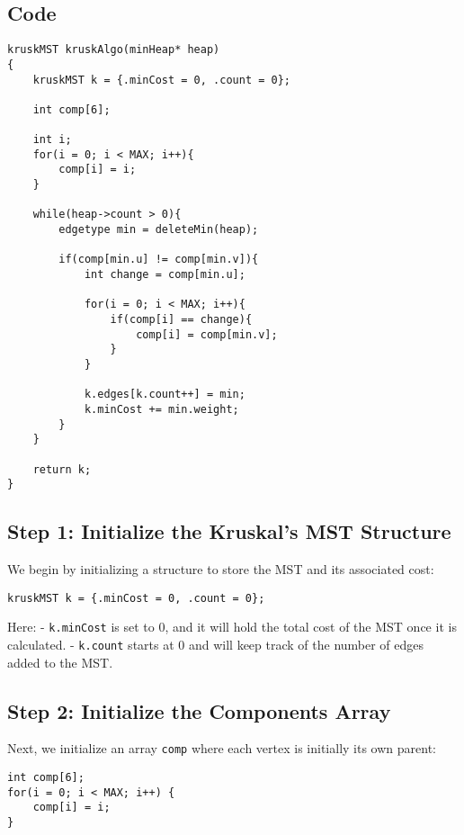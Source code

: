 \documentclass{book}
\begin{document}
\newpage
\subsection{Code}

\begin{verbatim}
kruskMST kruskAlgo(minHeap* heap)
{
    kruskMST k = {.minCost = 0, .count = 0};

    int comp[6];
    
    int i;
    for(i = 0; i < MAX; i++){
        comp[i] = i;
    }

    while(heap->count > 0){
        edgetype min = deleteMin(heap);
        
        if(comp[min.u] != comp[min.v]){
            int change = comp[min.u];

            for(i = 0; i < MAX; i++){
                if(comp[i] == change){
                    comp[i] = comp[min.v];
                }
            }
            
            k.edges[k.count++] = min;
            k.minCost += min.weight;
        }
    }
    
    return k;
}
\end{verbatim}

\twocolumn



\newpage
\onecolumn
\subsection{Step 1: Initialize the Kruskal's MST Structure}

We begin by initializing a structure to store the MST and its associated cost:

\begin{verbatim}
kruskMST k = {.minCost = 0, .count = 0};
\end{verbatim}

Here:
- \texttt{k.minCost} is set to 0, and it will hold the total cost of the MST once it is calculated.
- \texttt{k.count} starts at 0 and will keep track of the number of edges added to the MST.

\subsection{Step 2: Initialize the Components Array}

Next, we initialize an array \texttt{comp} where each vertex is initially its own parent:

\begin{verbatim}
int comp[6];
for(i = 0; i < MAX; i++) {
    comp[i] = i;
}
\end{verbatim}
\end{document}

